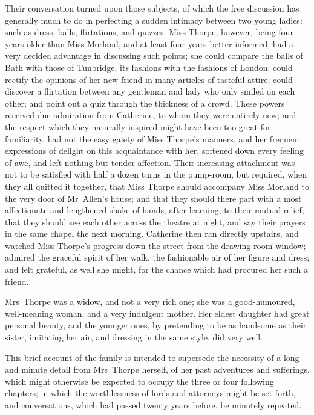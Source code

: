  Their conversation turned upon those subjects, of which the free discussion has generally much to do in perfecting a sudden intimacy between two young ladies: such as dress, balls, flirtations, and quizzes. Miss Thorpe, however, being four years older than Miss Morland, and at least four years better informed, had a very decided advantage in discussing such points; she could compare the balls of Bath with those of Tunbridge, its fashions with the fashions of London; could rectify the opinions of her new friend in many articles of tasteful attire; could discover a flirtation between any gentleman and lady who only smiled on each other; and point out a quiz through the thickness of a crowd. These powers received due admiration from Catherine, to whom they were entirely new; and the respect which they naturally inspired might have been too great for familiarity, had not the easy gaiety of Miss Thorpe's manners, and her frequent expressions of delight on this acquaintance with her, softened down every feeling of awe, and left nothing but tender affection. Their increasing attachment was not to be satisfied with half a dozen turns in the pump-room, but required, when they all quitted it together, that Miss Thorpe should accompany Miss Morland to the very door of Mr~Allen's house; and that they should there part with a most affectionate and lengthened shake of hands, after learning, to their mutual relief, that they should see each other across the theatre at night, and say their prayers in the same chapel the next morning. Catherine then ran directly upstairs, and watched Miss Thorpe's progress down the street from the drawing-room window; admired the graceful spirit of her walk, the fashionable air of her figure and dress; and felt grateful, as well she might, for the chance which had procured her such a friend. 

 Mrs~Thorpe was a widow, and not a very rich one; she was a good-humoured, well-meaning woman, and a very indulgent mother. Her eldest daughter had great personal beauty, and the younger ones, by pretending to be as handsome as their sister, imitating her air, and dressing in the same style, did very well. 

 This brief account of the family is intended to supersede the necessity of a long and minute detail from Mrs~Thorpe herself, of her past adventures and sufferings, which might otherwise be expected to occupy the three or four following chapters; in which the worthlessness of lords and attorneys might be set forth, and conversations, which had passed twenty years before, be minutely repeated. 